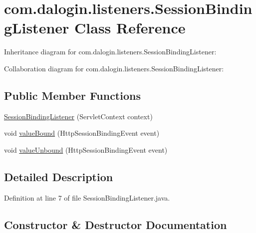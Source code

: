 \hypertarget{classcom_1_1dalogin_1_1listeners_1_1_session_binding_listener}{}\section{com.\+dalogin.\+listeners.\+Session\+Binding\+Listener Class Reference}
\label{classcom_1_1dalogin_1_1listeners_1_1_session_binding_listener}


Inheritance diagram for com.\+dalogin.\+listeners.\+Session\+Binding\+Listener\+:


Collaboration diagram for com.\+dalogin.\+listeners.\+Session\+Binding\+Listener\+:
\subsection*{Public Member Functions}
\begin{DoxyCompactItemize}
\item 
\hyperlink{classcom_1_1dalogin_1_1listeners_1_1_session_binding_listener_ab9fe44ee4102ec6970a89ea95188d84d}{Session\+Binding\+Listener} (Servlet\+Context context)
\item 
void \hyperlink{classcom_1_1dalogin_1_1listeners_1_1_session_binding_listener_abcc8ed73404e850243f740bf2f5c290d}{value\+Bound} (Http\+Session\+Binding\+Event event)
\item 
void \hyperlink{classcom_1_1dalogin_1_1listeners_1_1_session_binding_listener_a7183c5033b75196577a8834d8a8f193b}{value\+Unbound} (Http\+Session\+Binding\+Event event)
\end{DoxyCompactItemize}


\subsection{Detailed Description}


Definition at line 7 of file Session\+Binding\+Listener.\+java.



\subsection{Constructor \& Destructor Documentation}
\mbox{\label{classcom_1_1dalogin_1_1listeners_1_1_session_binding_listener_ab9fe44ee4102ec6970a89ea95188d84d}} 
